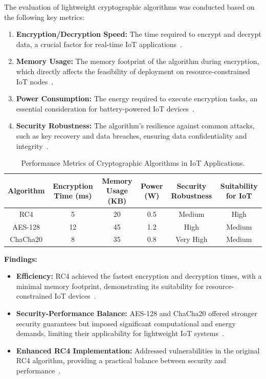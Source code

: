 \documentclass[journal]{Definitions/mdpi}
\begin{document}
The evaluation of lightweight cryptographic algorithms was conducted based on the following key metrics:
\begin{enumerate}
    \item \textbf{Encryption/Decryption Speed:} The time required to encrypt and decrypt data, a crucial factor for real-time IoT applications~\cite{ref-journal2, ref-journal8, ref-mdpi8}.
    \item \textbf{Memory Usage:} The memory footprint of the algorithm during encryption, which directly affects the feasibility of deployment on resource-constrained IoT nodes~\cite{ref-journal6, ref-mdpi8}.
    \item \textbf{Power Consumption:} The energy required to execute encryption tasks, an essential consideration for battery-powered IoT devices~\cite{ref-mdpi2, ref-journal8, ref-mdpi8}.
    \item \textbf{Security Robustness:} The algorithm's resilience against common attacks, such as key recovery and data breaches, ensuring data confidentiality and integrity~\cite{ref-standards1, ref-mdpi8}.
\end{enumerate}

\begin{table}[H]
\caption{Performance Metrics of Cryptographic Algorithms in IoT Applications.}
\label{tab:comparison_cryptography}
\centering
\begin{tabularx}{\textwidth}{CCCCCC}
\toprule
\textbf{Algorithm} & \textbf{Encryption Time (ms)} & \textbf{Memory Usage (KB)} & \textbf{Power (W)} & \textbf{Security Robustness} & \textbf{Suitability for IoT} \\
\midrule
RC4        & 5     & 20    & 0.5   & Medium  & High \\
AES-128    & 12    & 45    & 1.2   & High    & Medium \\
ChaCha20   & 8     & 35    & 0.8   & Very High & Medium \\
\bottomrule
\end{tabularx}
\end{table}

\textbf{Findings:}
\begin{itemize}
    \item \textbf{Efficiency:} RC4 achieved the fastest encryption and decryption times, with a minimal memory footprint, demonstrating its suitability for resource-constrained IoT devices~\cite{ref-journal2, ref-journal8, ref-mdpi8}.
    \item \textbf{Security-Performance Balance:} AES-128 and ChaCha20 offered stronger security guarantees but imposed significant computational and energy demands, limiting their applicability for lightweight IoT systems~\cite{ref-mdpi2, ref-mdpi3, ref-mdpi8}.
    \item \textbf{Enhanced RC4 Implementation:} Addressed vulnerabilities in the original RC4 algorithm, providing a practical balance between security and performance~\cite{ref-mdpi4, ref-standards1, ref-mdpi7}.
\end{itemize}
\end{document}
